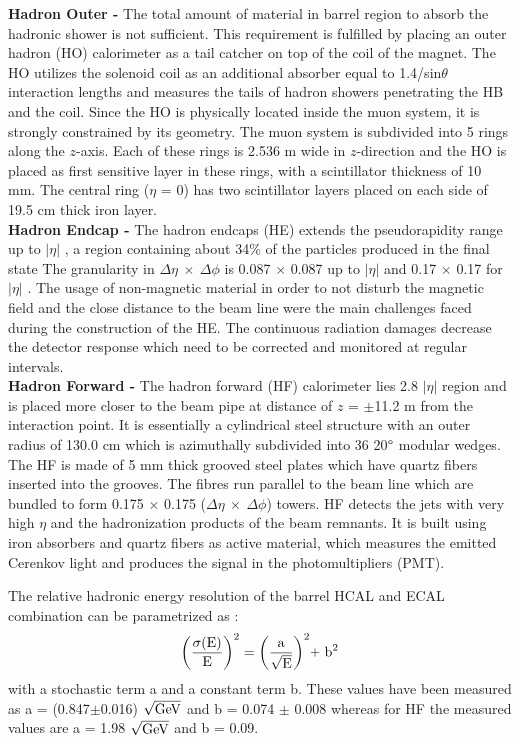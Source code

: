 {\bf Hadron Outer -} The total amount of material in barrel region to absorb the hadronic shower is not sufficient. This requirement is fulfilled by placing an outer hadron (HO) calorimeter as a tail catcher on top of the coil of the magnet. The HO utilizes the solenoid coil as an additional absorber equal to 1.4/sin$\theta$ interaction lengths and measures the tails of hadron showers penetrating the HB and the coil. Since the HO is physically located inside the muon system, it is strongly constrained by its geometry. The muon system is subdivided into 5 rings along the $z$-axis. Each of these rings is 2.536 m wide in $z$-direction and the HO is placed as first sensitive layer in these rings, with a scintillator thickness of 10 mm. The central ring ($\eta$ = 0) has two scintillator layers placed on each side of 19.5 cm thick iron layer.\\ \newline
{\bf Hadron Endcap -} The hadron endcaps (HE) extends the pseudorapidity range up to $|\eta|$ , a region containing about 34\% of the particles produced in the final state The granularity in $\Delta\eta~\times~\Delta\phi$ is 0.087 $\times$ 0.087 up to $|\eta|$  and 0.17 $\times$ 0.17 for $|\eta|$ . The usage of non-magnetic material in order to not disturb the magnetic field and the close distance to the beam line were the main challenges faced during the construction of the HE. The continuous radiation damages decrease the detector response which need to be corrected and monitored at regular intervals. \\ \newline
{\bf Hadron Forward -} The hadron forward (HF) calorimeter lies 2.8 \ls $|\eta|$  region and is placed more closer to the beam pipe at distance of $z$ = $\pm$11.2 m from the interaction point. It is essentially a cylindrical steel structure with an outer radius of 130.0 cm which is azimuthally subdivided into 36 20$\degree$ modular wedges. The HF is made of 5 mm thick grooved steel plates which have quartz fibers inserted into the grooves. The fibres run parallel to the beam line which are bundled to form 0.175 $\times$ 0.175 ($\Delta\eta~\times~\Delta\phi$) towers. HF detects the jets with very high $\eta$ and the hadronization products of the beam remnants. It is built using iron absorbers and quartz fibers as active material, which measures the emitted Cerenkov light and produces the signal in the photomultipliers (PMT).

The relative hadronic energy resolution of the barrel HCAL and ECAL combination can be parametrized as :
\begin{equation}
{\rm \bigg(\frac{\sigma(E)}{E}\bigg)^2 = \bigg(\frac{a}{\sqrt{E}}\bigg)^2 \plus b^2}
\end{equation}
with a stochastic term a and a constant term b. These values have been measured \cite{Chatrchyan:2009ag} as a = (0.847$\pm$0.016) $\sqrt{\rm GeV}$ and b = 0.074 $\pm$ 0.008 whereas for HF the measured values are a = 1.98 $\sqrt{\rm GeV}$ and b = 0.09.

